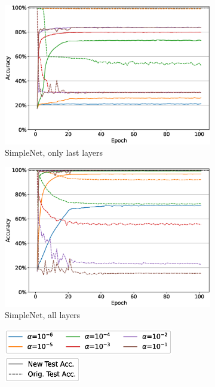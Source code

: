 \begin{figure}
     \centering
     \begin{subfigure}[b]{0.49\textwidth}
         \centering
         \includegraphics[width=\textwidth]{images/finetuning/finetuning_nonwm_model_thesis_simplenet_mnist_tunealllayers_False.eps}
         \caption{SimpleNet, only last layers}
         \label{fig:finetuning_simplenet_lastlayer}
     \end{subfigure}
     \hfill
     \begin{subfigure}[b]{0.49\textwidth}
         \centering
         \includegraphics[width=\textwidth]{images/finetuning/finetuning_nonwm_model_thesis_simplenet_mnist_tunealllayers_True.eps}
         \caption{SimpleNet, all layers}
         \label{fig:finetuning_simplenet_alllayers}
     \end{subfigure}
     \hfill
     \begin{subfigure}[b]{\textwidth}
         \centering
         \includegraphics[height=1.1cm]{images/finetuning/legend_finetuning_allvslast_colors.eps}
         \quad
         \includegraphics[height=1.1cm]{images/finetuning/legend_finetuning_allvslast_linetypes.eps}


\end{subfigure}
\end{figure}
